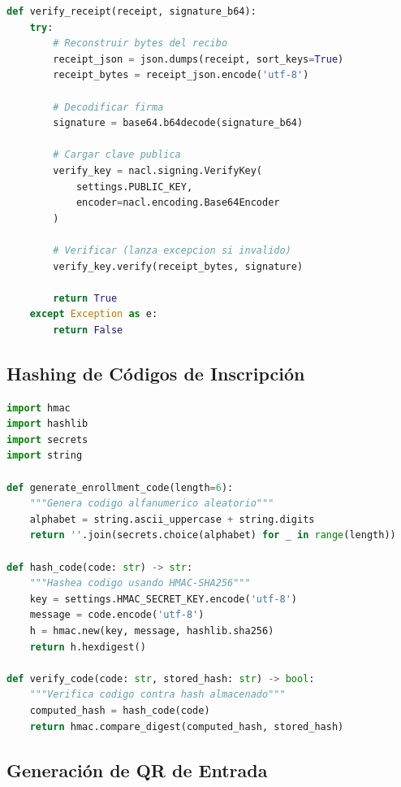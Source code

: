 \documentclass[12pt,a4paper]{article}
\begin{document}
\begin{lstlisting}[language=Python]
def verify_receipt(receipt, signature_b64):
    try:
        # Reconstruir bytes del recibo
        receipt_json = json.dumps(receipt, sort_keys=True)
        receipt_bytes = receipt_json.encode('utf-8')
        
        # Decodificar firma
        signature = base64.b64decode(signature_b64)
        
        # Cargar clave publica
        verify_key = nacl.signing.VerifyKey(
            settings.PUBLIC_KEY,
            encoder=nacl.encoding.Base64Encoder
        )
        
        # Verificar (lanza excepcion si invalido)
        verify_key.verify(receipt_bytes, signature)
        
        return True
    except Exception as e:
        return False
\end{lstlisting}

\subsection{Hashing de Códigos de Inscripción}

\begin{lstlisting}[language=Python]
import hmac
import hashlib
import secrets
import string

def generate_enrollment_code(length=6):
    """Genera codigo alfanumerico aleatorio"""
    alphabet = string.ascii_uppercase + string.digits
    return ''.join(secrets.choice(alphabet) for _ in range(length))

def hash_code(code: str) -> str:
    """Hashea codigo usando HMAC-SHA256"""
    key = settings.HMAC_SECRET_KEY.encode('utf-8')
    message = code.encode('utf-8')
    h = hmac.new(key, message, hashlib.sha256)
    return h.hexdigest()

def verify_code(code: str, stored_hash: str) -> bool:
    """Verifica codigo contra hash almacenado"""
    computed_hash = hash_code(code)
    return hmac.compare_digest(computed_hash, stored_hash)
\end{lstlisting}

\subsection{Generación de QR de Entrada}
\end{document}
